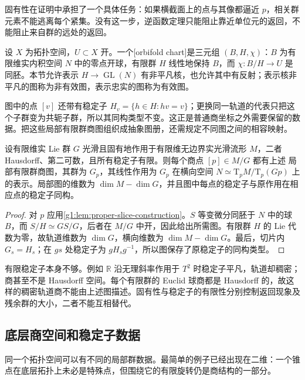 固有性在证明中承担了一个具体任务：如果横截面上的点与其像都逼近 \(p\)，相关群元素不能逃离每个紧集。没有这一步，逆函数定理只能阻止靠近单位元的返回，不能阻止来自群的远处的返回。

\begin{definition}\label{g1:def:orbifold-chart-local}
	设 \(X\) 为拓扑空间，\(U\subset X\) 开。一个[orbifold chart]是三元组 \((B,H,\chi)\)：\(B\) 为有限维实内积空间 \(N\) 中的零点开球，有限群 \(H\) 线性地保持 \(B\)，而 \(\chi:B/H\to U\) 是同胚。本节允许表示 \(H\to\operatorname{GL}(N)\) 有非平凡核，也允许其中有反射；表示核非平凡的图称为非有效图，表示忠实的图称为有效图。
\end{definition}

图中的点 \([v]\) 还带有稳定子 \(H_v=\{h\in H:hv=v\}\)；更换同一轨道的代表只把这个子群变为共轭子群，所以其同构类型不变。这正是普通商坐标之外需要保留的数据。把这些局部有限群商图组织成抽象图册，还需规定不同图之间的相容映射。

\begin{corollary}\label{g1:cor:finite-stabilizer-local-quotient}
	设有限维实 Lie 群 \(G\) 光滑且固有地作用于有限维无边界实光滑流形 \(M\)，二者 Hausdorff、第二可数，且所有稳定子有限。则每个商点 \([p]\in M/G\) 都有上述 局部有限群商图，其群为 \(G_p\)，其线性作用为 \(G_p\) 在横向空间 \(N\simeq \mathrm{T}_pM/\mathrm{T}_p(Gp)\) 上的表示。局部图的维数为 \(\dim M-\dim G\)，并且图中每点的稳定子与原作用在相应点的稳定子同构。
\end{corollary}
\begin{proof}
	对 \(p\) 应用\cref{g1:lem:proper-slice-construction}。\(S\) 等变微分同胚于 \(N\) 中的球 \(B\)，而 \(S/H\simeq GS/G\)，后者在 \(M/G\) 中开，因此给出所需图。有限群 \(H\) 的 Lie 代数为零，故轨道维数为 \(\dim G\)，横向维数为 \(\dim M-\dim G\)。最后，切片内 \(G_s=H_s\)；在 \(gs\) 处稳定子为 \(gH_sg^{-1}\)，所以图保存了原稳定子的同构类型。
\end{proof}

有限稳定子本身不够。例如 \(\mathbb R\) 沿无理斜率作用于 \(T^2\) 时稳定子平凡，轨道却稠密；商甚至不是 Hausdorff 空间。每个有限群的 Euclid 球商都是 Hausdorff 的，故这样的稠密轨道商不能由上述图描述。固有性与稳定子的有限性分别控制返回现象及残余群的大小，二者不能互相替代。

\subsection{底层商空间和稳定子数据}
\label{g1:subsec:1704:03}

同一个拓扑空间可以有不同的局部群数据。最简单的例子已经出现在二维：一个锥点在底层拓扑上未必是特殊点，但围绕它的有限旋转仍是商结构的一部分。

